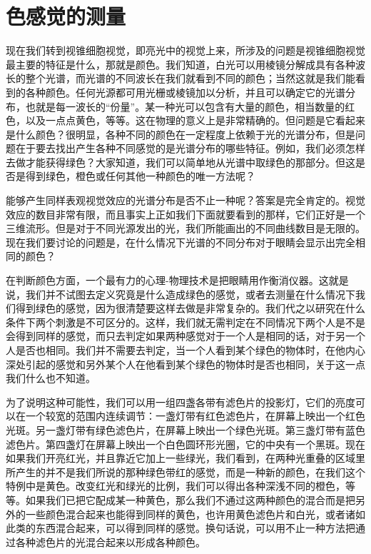 \section{色感觉的测量}

现在我们转到视锥细胞视觉，即亮光中的视觉上来，所涉及的问题是视锥细胞视觉最主要的特征是什么，那就是颜色。我们知道，白光可以用棱镜分解成具有各种波长的整个光谱，而光谱的不同波长在我们就看到不同的颜色；当然这就是我们能看到的各种颜色。任何光源都可用光栅或棱镜加以分析，并且可以确定它的光谱分布，也就是每一波长的“份量”。某一种光可以包含有大量的颜色，相当数量的红色，以及一点点黄色，等等。这在物理的意义上是非常精确的。但问题是它看起来是什么颜色？很明显，各种不同的颜色在一定程度上依赖于光的光谱分布，但是问题在于要去找出产生各种不同感觉的是光谱分布的哪些特征。例如，我们必须怎样去做才能获得绿色？大家知道，我们可以简单地从光谱中取绿色的那部分。但这是否是得到绿色，橙色或任何其他一种颜色的唯一方法呢？

能够产生同样表观视觉效应的光谱分布是否不止一种呢？答案是完全肯定的。视觉效应的数目非常有限，而且事实上正如我们下面就要看到的那样，它们正好是一个三维流形。但是对于不同光源发出的光，我们所能画出的不同曲线数目是无限的。现在我们要讨论的问题是，在什么情况下光谱的不同分布对于眼睛会显示出完全相同的颜色？

在判断颜色方面，一个最有力的心理-物理技术是把眼睛用作衡消仪器。这就是说，我们并不试图去定义究竟是什么造成绿色的感觉，或者去测量在什么情况下我们得到绿色的感觉，因为很清楚要这样去做是非常复杂的。我们代之以研究在什么条件下两个刺激是不可区分的。这样，我们就无需判定在不同情况下两个人是不是会得到同样的感觉，而只去判定如果两种感觉对于一个人是相同的话，对于另一个人是否也相同。我们并不需要去判定，当一个人看到某个绿色的物体时，在他内心深处引起的感觉和另外某个人在他看到某个绿色的物体时是否也相同，关于这一点我们什么也不知道。

为了说明这种可能性，我们可以用一组四盏各带有滤色片的投影灯，它们的亮度可以在一个较宽的范围内连续调节：一盏灯带有红色滤色片，在屏幕上映出一个红色光斑。另一盏灯带有绿色滤色片，在屏幕上映出一个绿色光斑。第三盏灯带有蓝色滤色片。第四盏灯在屏幕上映出一个白色圆环形光圈，它的中央有一个黑斑。现在如果我们开亮红光，并且靠近它加上一些绿光，我们看到，在两种光重叠的区域里所产生的并不是我们所说的那种绿色带红的感觉，而是一种新的颜色，在我们这个特例中是黄色。改变红光和绿光的比例，我们可以得出各种深浅不同的橙色，等等。如果我们已把它配成某一种黄色，那么我们不通过这两种颜色的混合而是把另外的一些颜色混合起来也能得到同样的黄色，也许用黄色滤色片和白光，或者诸如此类的东西混合起来，可以得到同样的感觉。换句话说，可以用不止一种方法把通过各种滤色片的光混合起来以形成各种颜色。

